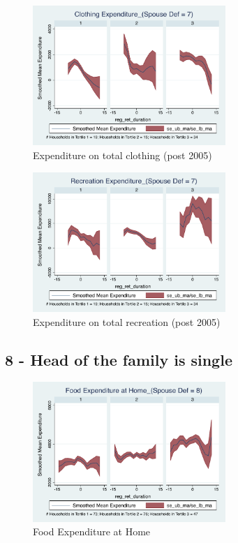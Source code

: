 \documentclass[11pt,onecolumn]{article}
\numberwithin{figure}{section}
\begin{document}
\begin{figure}[h]
	\caption{Expenditure on total clothing (post 2005)}
	\centering
	\includegraphics[width=0.65\textwidth]{../ConsumptionPostRetirement_by_SpouseDef_Cats/Smoothed/7/spouse_def_total_clothing_2005_real.pdf}
\end{figure}

\begin{figure}[h]
	\caption{Expenditure on total recreation (post 2005)}
	\centering
	\includegraphics[width=0.65\textwidth]{../ConsumptionPostRetirement_by_SpouseDef_Cats/Smoothed/7/spouse_def_total_recreation_2005_real.pdf}
\end{figure}

\clearpage


\subsection{8 - Head of the family is single}

\begin{figure}[h]
	\caption{Food Expenditure at Home}
	\centering
	\includegraphics[width=0.65\textwidth]{../ConsumptionPostRetirement_by_SpouseDef_Cats/Smoothed/8/spouse_def_total_foodexp_home_real.pdf}
\end{figure}
\end{document}
